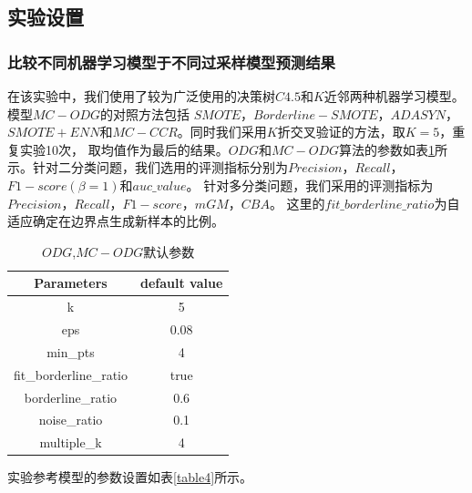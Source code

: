 \documentclass{article}
\begin{document}
\subsection{实验设置}
\subsubsection{比较不同机器学习模型于不同过采样模型预测结果}
在该实验中，我们使用了较为广泛使用的决策树$C4.5$和$K$近邻两种机器学习模型。模型$MC-ODG$的对照方法包括
$SMOTE$，$Borderline-SMOTE$，$ADASYN$，$SMOTE+ENN$和$MC-CCR$。同时我们采用$K$折交叉验证的方法，取$K=5$，重复实验10次，
取均值作为最后的结果。$ODG$和$MC-ODG$算法的参数如表\ref{table6}所示。针对二分类问题，我们选用的评测指标分别为$Precision$，$Recall$，$F1-score(\beta=1)$和$auc\_value$。
针对多分类问题，我们采用的评测指标为$Precision$，$Recall$，$F1-score$，$mGM$，$CBA$。
这里的$fit\_borderline\_ratio$为自适应确定在边界点生成新样本的比例。
\begin{table}[]
  \caption{$ODG$,$MC-ODG$默认参数}
  \label{table6}
  \begin{tabular}{@{}cc@{}}
  \toprule
  Parameters             & default value \\ \midrule
  k                      & 5             \\
  eps                    & 0.08          \\
  min\_pts               & 4             \\
  fit\_borderline\_ratio & true          \\
  borderline\_ratio      & 0.6           \\
  noise\_ratio           & 0.1           \\
  multiple\_k            & 4             \\ \bottomrule
  \end{tabular}
  \end{table}
实验参考模型的参数设置如表\ref{table4}所示。
\end{document}
